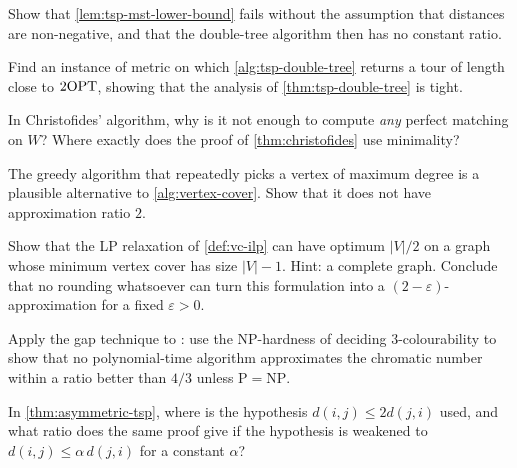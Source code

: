 \begin{exercise}
Show that \cref{lem:tsp-mst-lower-bound} fails without the assumption that
distances are non-negative, and that the double-tree algorithm then has no
constant ratio.
\end{exercise}

\begin{exercise}
Find an instance of metric  on which \cref{alg:tsp-double-tree}
returns a tour of length close to $2\mathrm{OPT}$, showing that the analysis of
\cref{thm:tsp-double-tree} is tight.
\end{exercise}

\begin{exercise}
In Christofides' algorithm, why is it not enough to compute \emph{any} perfect
matching on $W$? Where exactly does the proof of \cref{thm:christofides} use
minimality?
\end{exercise}

\begin{exercise}
The greedy algorithm that repeatedly picks a vertex of maximum degree is a
plausible alternative to \cref{alg:vertex-cover}. Show that it does not have
approximation ratio $2$.
\end{exercise}

\begin{exercise}
Show that the LP relaxation of \cref{def:vc-ilp} can have optimum $|V|/2$ on a
graph whose minimum vertex cover has size $|V| - 1$. Hint: a complete graph.
Conclude that no rounding whatsoever can turn this formulation into a
$(2-\varepsilon)$-approximation for a fixed $\varepsilon > 0$.
\end{exercise}

\begin{exercise}
Apply the gap technique to : use the
\textrm{NP}-hardness of deciding $3$-colourability to show that no
polynomial-time algorithm approximates the chromatic number within a ratio
better than $4/3$ unless $\mathrm{P} = \mathrm{NP}$.
\end{exercise}

\begin{exercise}
In \cref{thm:asymmetric-tsp}, where is the hypothesis $d(i,j) \le 2 d(j,i)$
used, and what ratio does the same proof give if the hypothesis is weakened to
$d(i,j) \le \alpha\, d(j,i)$ for a constant $\alpha$?
\end{exercise}
